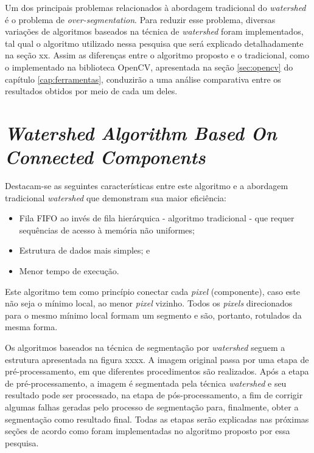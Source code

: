 Um dos principais problemas relacionados à abordagem tradicional do \textit{watershed} é o problema de \textit{over-segmentation}. Para reduzir esse problema, diversas variações de algoritmos baseados na técnica de \textit{watershed} foram implementados, tal qual o algoritmo utilizado nessa pesquisa que será explicado detalhadamente na seção xx. Assim as diferenças entre o algoritmo proposto e o tradicional, como o implementado na biblioteca OpenCV, apresentada na seção \ref{sec:opencv} do capítulo \ref{cap:ferramentas}, conduzirão a uma análise comparativa entre os resultados obtidos por meio de cada um deles.

\section{\textit{Watershed Algorithm Based On Connected Components}}
Destacam-se as seguintes características entre este algoritmo e a abordagem tradicional \textit{watershed} que demonstram sua maior eficiência:

\begin{itemize}
    \item Fila FIFO ao invés de fila hierárquica - algoritmo tradicional - que requer sequências de acesso à memória não uniformes;
    \item Estrutura de dados mais simples; e
    \item Menor tempo de execução.
\end{itemize}    

Este algoritmo tem como princípio conectar cada \textit{pixel} (componente), caso este não seja o mínimo local, ao menor \textit{pixel} vizinho. Todos os \textit{pixels} direcionados para o mesmo mínimo local formam um segmento e são, portanto, rotulados da mesma forma.



Os algoritmos baseados na técnica de segmentação por \textit{watershed} seguem a estrutura apresentada na figura xxxx. A imagem original passa por uma etapa de pré-processamento, em que diferentes procedimentos são realizados. Após a etapa de pré-processamento, a imagem é segmentada pela técnica \textit{watershed} e seu resultado pode ser processado, na etapa de pós-processamento, a fim de corrigir algumas falhas geradas pelo processo de segmentação para, finalmente, obter a segmentação como resultado final.
Todas as etapas serão explicadas nas próximas seções de acordo como foram implementadas no algoritmo proposto por essa pesquisa.

